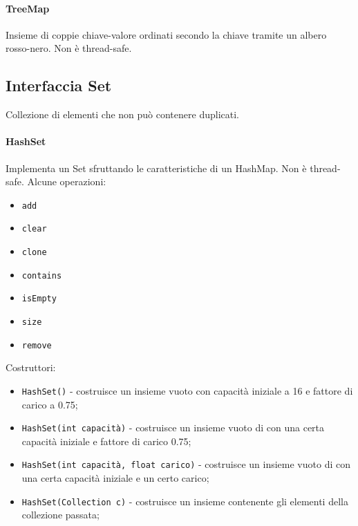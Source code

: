 \paragraph{TreeMap}
Insieme di coppie chiave-valore ordinati secondo la chiave tramite un albero rosso-nero. Non è thread-safe. 

\subsection{Interfaccia Set}
Collezione di elementi che non può contenere duplicati.

\paragraph{HashSet}
Implementa un Set sfruttando le caratteristiche di un HashMap. Non è thread-safe. Alcune operazioni:
\begin{itemize}
\item \texttt{add}
\item \texttt{clear}
\item \texttt{clone}
\item \texttt{contains}
\item \texttt{isEmpty}
\item \texttt{size}
\item \texttt{remove}
\end{itemize}
Costruttori:
\begin{itemize}
\item \texttt{HashSet()} - costruisce un insieme vuoto con capacità iniziale a 16 e fattore di carico a 0.75;
\item \texttt{HashSet(int capacità)} - costruisce un insieme vuoto di con una certa capacità iniziale e fattore di carico 0.75;
\item \texttt{HashSet(int capacità, float carico)} - costruisce un insieme vuoto di con una certa capacità iniziale e un certo carico;
\item \texttt{HashSet(Collection c)} - costruisce un insieme contenente gli elementi della collezione passata;
\end{itemize}

